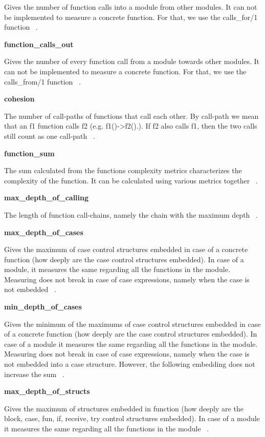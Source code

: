 Gives the number of function calls into a module from other modules. It can not be implemented to measure a concrete function. For that, we use the calls\_for/1 function ~\cite{refactorerlm}.

\textbf{function\_calls\_out}

Gives the number of every function call from a module towards other modules. It can not be implemented to measure a concrete function. For that, we use the calls\_from/1 function ~\cite{refactorerlm}.

\textbf{cohesion}

The number of call-paths of functions that call each other. By call-path we mean that an f1 function calls f2 (e.g. f1()->f2().). If f2 also calls f1, then the two calls still count as one call-path ~\cite{refactorerlm}.

\textbf{function\_sum}

The sum calculated from the functions complexity metrics characterizes the complexity of the function. It can be calculated using various metrics together ~\cite{refactorerlm}.
	 
\textbf{max\_depth\_of\_calling}

The length of function call-chains, namely the chain with the maximum depth ~\cite{refactorerlm}.
	 
\textbf{max\_depth\_of\_cases}

 Gives the maximum of case control structures embedded in case of a concrete function (how deeply are the case control structures embedded). In case of a module, it measures the same regarding all the functions in the module. Measuring does not break in case of case expressions, namely when the case is not embedded ~\cite{refactorerlm}.

\textbf{min\_depth\_of\_cases}

 Gives the minimum of the maximums of case control structures embedded in case of a concrete function (how deeply are the case control structures embedded). In case of a module it measures the same regarding all the functions in the module. Measuring does not break in case of case expressions, namely when the case is not embedded into a case structure. However, the following embedding does not increase the sum ~\cite{refactorerlm}.

\textbf{max\_depth\_of\_structs}

 Gives the maximum of structures embedded in function (how deeply are the block, case, fun, if, receive, try control structures embedded). In case of a module it measures the same regarding all the functions in the module ~\cite{refactorerlm}.

